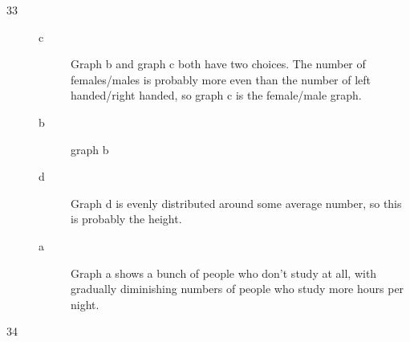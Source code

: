\documentclass{exam}
\begin{document}
\begin{description}
      \pagebreak

      \item[33]
        \begin{description}
          \item[c] Graph b and graph c both have two choices.  The number of
            females/males is probably more even than the number of left
            handed/right handed, so graph c is the female/male graph.

          \item[b] graph b

          \item[d] Graph d is evenly distributed around some average number, so
            this is probably the height.

          \item[a] Graph a shows a bunch of people who don't study at all, with
            gradually diminishing numbers of people who study more hours per
            night.
        \end{description}

      \item[34]
\end{description}
\end{document}
